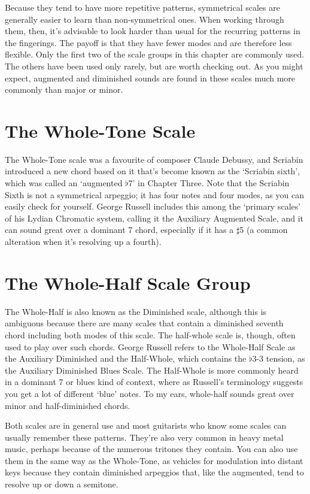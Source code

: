 \documentclass[english]{./gbook}
\begin{document}
\begin{large}
Because they tend to have more repetitive patterns, symmetrical scales are generally easier to learn than non-symmetrical ones. When working through them, then, it's advisable to look harder than usual for the recurring patterns in the fingerings. The payoff is that they have fewer modes and are therefore less flexible. Only the first two of the scale groups in this chapter are commonly used. The others have been used only rarely, but are worth checking out. As you might expect, augmented and diminished sounds are found in these scales much more commonly than major or minor.

\section{The Whole-Tone Scale}

The Whole-Tone scale was a favourite of composer Claude Debussy, and Scriabin introduced a new chord based on it that's become known as the `Scriabin sixth', which was called an `augmented $\flat$7' in Chapter Three. Note that the Scriabin Sixth is not a symmetrical arpeggio; it has four notes and four modes, as you can easily check for yourself. George Russell includes this among the `primary scales' of his Lydian Chromatic system, calling it the Auxiliary Augmented Scale, and it can sound great over a dominant 7 chord, especially if it has a $\sharp$5 (a common alteration when it's resolving up a fourth).

\section{The Whole-Half Scale Group}
The Whole-Half is also known as the Diminished scale, although this is ambiguous because there are many scales that contain a diminished seventh chord including both modes of this scale. The half-whole scale is, though, often used to play over such chords. George Russell refers to the Whole-Half Scale as the Auxiliary Diminished and the Half-Whole, which contains the $\flat3$-3 tension, as the Auxiliary Diminished Blues Scale. The Half-Whole is more commonly heard in a dominant 7 or blues kind of context, where as Russell's terminology suggests you get a lot of different `blue' notes. To my ears, whole-half sounds great over minor and half-diminished chords.

Both scales are in general use and most guitarists who know some scales can usually remember these patterns. They're also very common in heavy metal music, perhaps because of the numerous tritones they contain. You can also use them in the same way as the Whole-Tone, as vehicles for modulation into distant keys because they contain diminished arpeggios that, like the augmented, tend to resolve up or down a semitone.


\end{large}
\end{document}
